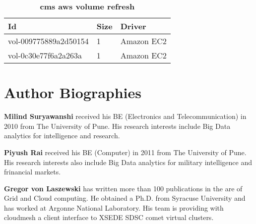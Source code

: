 \documentclass[9pt,twocolumn,twoside]{../../styles/osajnl}
\begin{document}
	\begin{table}[h!]
	\caption{\bf cms aws volume refresh }
	\begin{tabular}{ | m{4.2cm} | m{1cm} | m{2.4cm} |}
		\hline
		Id & Size & Driver \\
		\hline
		vol-009775889a2d50154 & 1 & Amazon EC2\\
		vol-0c30e77f6a2a263a & 1 & Amazon EC2\\
		\hline
	\end{tabular}
	\label{tab:tab8}
\end{table}

	

\begin{comment}
\section*{Acknowledgements}

Prof. Gregor von Laszewski originally suggested this project and
provided the objectives in simplistic form. He reviewd the code as it
was developed during the course of this project. His inputs helped us
to make the code more secure and efficient. He provided us with
different resources to look for help and overcome the challenges faced
during the course.
\end{comment}



 
\section*{Author Biographies}
\begingroup
\setlength\intextsep{0pt}
\begin{minipage}{1.0\columnwidth}
  \noindent
  {\bfseries Milind Suryawanshi} received his BE (Electronics and
  Telecommunication) in 2010 from The University of Pune. His research
  interests include Big Data analytics for intelligence and research.
\end{minipage}
\begin{minipage}{1.0\columnwidth} 
  \noindent
  {\bfseries Piyush Rai} received his BE (Computer) in 2011 from The
  University of Pune. His research interests also include Big Data
  analytics for military intelligence and frinancial markets.
\end{minipage}
\begin{minipage}{1.0\columnwidth} 
  \noindent
  {\bfseries Gregor von Laszewski} has written more than 100
  publications in the are of Grid and Cloud computing. He obtained a
  Ph.D. from Syracuse University and has worked at Argonne National
  Laboratory. His team is providing with cloudmesh a client interface
  to XSEDE SDSC comet virtual clusters.
\end{minipage}

\endgroup
\end{document}
